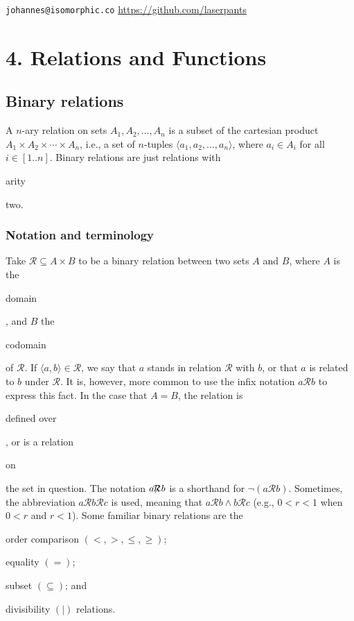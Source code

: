 \documentclass[11pt]{article}
\theoremstyle{plain}
\theoremstyle{definition}
\newenvironment{packed_items}{
\begin{itemize}
  \setlength{\itemsep}{1pt}
  \setlength{\parskip}{0pt}
  \setlength{\parsep}{0pt}
}{\end{itemize}}
\begin{document}
\noindent \verb|johannes@isomorphic.co| \hfill \url{https://github.com/laserpants} 

\section*{4. Relations and Functions}

\subsection*{Binary relations}

A $ n $-ary relation on sets $ A_1, A_2, \dots, A_n $ is a subset of the cartesian product $ A_1 \times A_2 \times \cdots \times A_n $, i.e., a set of $ n $-tuples $ \langle a_1, a_2, \dots, a_n \rangle $, where $ a_i \in A_i $ for all $ i \in [1 .. n]$. Binary relations are just relations with \begin{em}arity\end{em} two.  

\subsubsection*{Notation and terminology}

\noindent Take $ \mathcal{R} \subseteq A \times B $ to be a binary relation between two sets $ A $ and $ B $, where $ A $ is the \begin{em}domain\end{em}, and $ B $ the \begin{em}codomain\end{em} of $ \mathcal{R} $. If $ \langle a, b \rangle \in \mathcal{R} $, we say that $ a $ stands in relation $ \mathcal{R} $ with $ b $, or that $ a $ is related to $ b $ under $ \mathcal{R} $. It is, however, more common to use the infix notation $ a \mathcal{R} b $ to express this fact. In the case that $ A = B $, the relation is \begin{em}defined over\end{em}, or is a relation \begin{em}on\end{em} the set in question. 
The notation $ a \!\!\not\!\!\mathcal{R} b $ is a shorthand for $ \neg (a \mathcal{R} b) $.
Sometimes, the abbreviation $ a \mathcal{R} b \mathcal{R} c $ is used, meaning that $ a \mathcal{R} b \wedge b \mathcal{R} c $ (e.g., $ 0 < r < 1 $ when $ 0 < r $ and $ r < 1 $). 
Some familiar binary relations are the

\begin{packed_items}
	\item order comparison $(<, >, \le, \ge)$;
	\item equality $(=)$; 
	\item subset $(\subseteq)$; and 
	\item divisibility $(|)$ relations. 
\end{packed_items}
 
\end{document}
